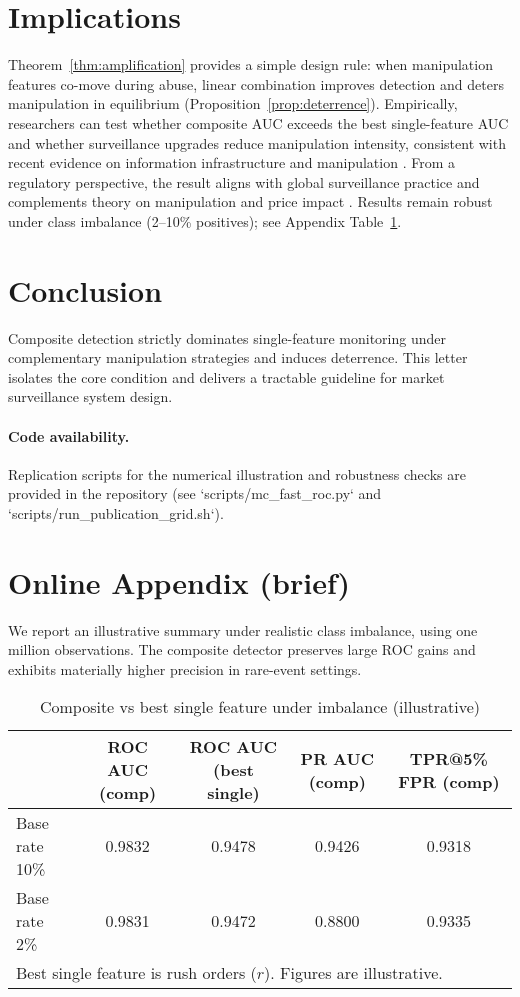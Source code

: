 \documentclass[preprint,12pt,authoryear]{elsarticle}
\begin{document}
\section{Implications}
Theorem~\ref{thm:amplification} provides a simple design rule: when manipulation features co-move during abuse, linear combination improves detection and deters manipulation in equilibrium (Proposition~\ref{prop:deterrence}). Empirically, researchers can test whether composite AUC exceeds the best single-feature AUC and whether surveillance upgrades reduce manipulation intensity, consistent with recent evidence on information infrastructure and manipulation \citep{liu2024asset,xiong2024information,wang2024information}. From a regulatory perspective, the result aligns with global surveillance practice \citep{cumming2008global} and complements theory on manipulation and price impact \citep{huberman2004price}. Results remain robust under class imbalance (2--10\% positives); see Appendix Table~\ref{tab:appendix-imbalance}.

\section{Conclusion}
Composite detection strictly dominates single-feature monitoring under complementary manipulation strategies and induces deterrence. This letter isolates the core condition and delivers a tractable guideline for market surveillance system design.

\paragraph{Code availability.} Replication scripts for the numerical illustration and robustness checks are provided in the repository (see `scripts/mc_fast_roc.py` and `scripts/run_publication_grid.sh`).

\section*{Online Appendix (brief)}
We report an illustrative summary under realistic class imbalance, using one million observations. The composite detector preserves large ROC gains and exhibits materially higher precision in rare-event settings.

\begin{table}[htbp]
\centering
\caption{Composite vs best single feature under imbalance (illustrative)}
\label{tab:appendix-imbalance}
\begin{tabular}{lcccc}
\hline
 & ROC AUC (comp) & ROC AUC (best single) & PR AUC (comp) & TPR@5\% FPR (comp) \\
\hline
Base rate 10\% & 0.9832 & 0.9478 & 0.9426 & 0.9318 \\
Base rate 2\%  & 0.9831 & 0.9472 & 0.8800 & 0.9335 \\
\hline
\multicolumn{5}{l}{\footnotesize Best single feature is rush orders ($r$). Figures are illustrative.}
\end{tabular}
\end{table}



\end{document}
